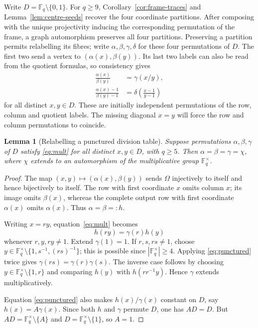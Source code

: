 \documentclass[11pt]{article}
\newtheorem{lemma}[theorem]{Lemma}
\theoremstyle{definition}
\theoremstyle{remark}
\newcommand{\F}{\mathbb F}
\begin{document}
Write $D=\F_q\setminus\{0,1\}$.  For $q\geq9$,
Corollary~\ref{cor:frame-traces} and Lemma~\ref{lem:centre-seeds} recover the four coordinate
partitions.  After composing with the unique projectivity inducing the
corresponding permutation of the frame, a graph automorphism preserves all
four partitions. Preserving a partition permits relabelling its fibres;
write $\alpha,\beta,\gamma,\delta$ for these four permutations of $D$.
The first two send a vertex to $(\alpha(x),\beta(y))$. Its last two
labels can also be read from the quotient formulas, so consistency gives
\begin{align}
 \frac{\alpha(x)}{\beta(y)}&=\gamma(x/y),\label{eq:mult}\\
 \frac{\alpha(x)-1}{\beta(y)-1}
   &=\delta\left(\frac{x-1}{y-1}\right)\label{eq:shift}
\end{align}
for all distinct $x,y\in D$. These are initially independent
permutations of the row, column and quotient labels. The missing diagonal
$x=y$ will force the row and column permutations to coincide.

\begin{lemma}[Relabelling a punctured division table]\label{lem:isotopy}
Suppose permutations $\alpha,\beta,\gamma$ of $D$ satisfy
\eqref{eq:mult} for all distinct $x,y\in D$, with $q\geq5$.  Then
$\alpha=\beta=\gamma=\chi$, where $\chi$ extends to an automorphism of the
multiplicative group $\F_q^\times$.
\end{lemma}

\begin{proof}
The map $(x,y)\mapsto(\alpha(x),\beta(y))$ sends $\Omega$ injectively to
itself and hence bijectively to itself.  The row with first coordinate $x$
omits column $x$; its image omits $\beta(x)$, whereas the complete output
row with first coordinate $\alpha(x)$ omits $\alpha(x)$.  Thus
$\alpha=\beta=:h$.

Writing $x=ry$, equation~\eqref{eq:mult} becomes
\begin{equation}
 h(ry)=\gamma(r)h(y)
 \label{eq:punctured}
\end{equation}
whenever $r,y,ry\ne1$.  Extend $\gamma(1)=1$.  If $r,s,rs\ne1$, choose
$y\in\F_q^\times\setminus\{1,s^{-1},(rs)^{-1}\}$; this is possible since
$|\F_q^\times|\geq4$.  Applying \eqref{eq:punctured} twice gives
$\gamma(rs)=\gamma(r)\gamma(s)$.  The inverse case follows by choosing
$y\in\F_q^\times\setminus\{1,r\}$ and comparing $h(y)$ with $h(rr^{-1}y)$.  Hence $\gamma$
extends multiplicatively.

Equation \eqref{eq:punctured} also makes $h(x)/\gamma(x)$ constant on $D$, say
$h(x)=A\gamma(x)$.  Since both $h$ and $\gamma$ permute $D$, one has
$AD=D$.  But $AD=\F_q^\times\setminus\{A\}$ and
$D=\F_q^\times\setminus\{1\}$, so $A=1$.
\end{proof}
\end{document}

